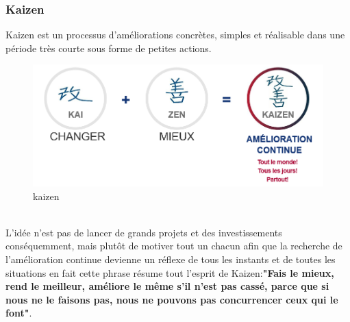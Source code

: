\documentclass[12pt, a4paper]{thesis}
\begin{document}
\subsubsection{Kaizen}
Kaizen est un processus d'améliorations concrètes, simples et réalisable dans une période très courte sous forme de petites actions.\\
\begin{figure}[!h]
\begin{center}
        \includegraphics[scale=0.4]{kaizen.PNG}
        \caption{kaizen}
\end{center}
\end{figure}\\


L'idée n'est pas de lancer de grands projets et des investissements conséquemment, mais plutôt de motiver tout un chacun afin que la recherche de l'amélioration continue devienne un réflexe de tous les instants et de toutes les situations en fait cette phrase résume tout l'esprit de Kaizen:\textbf{"Fais le mieux, rend le meilleur, améliore  le même s'il n'est pas cassé, parce que si nous ne le faisons pas, nous ne pouvons pas concurrencer ceux qui le font"}.
 
\end{document}
